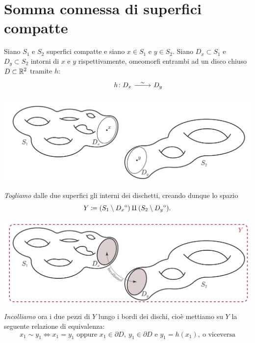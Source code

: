 \section{Somma connessa di superfici compatte}
Siano $S_1$ e $S_2$ superfici compatte e siano $x\in S_1$ e $y\in S_2$. Siano $D_x\subset S_1$ e $D_y\subset S_2$ intorni di $x$ e $y$ rispettivamente, omeomorfi entrambi ad un disco chiuso $D\subset\mathbb{R}^2$ tramite $h$:
\[\begin{tikzcd}
	{} & {h\colon D_x} & {D_y}
	\arrow["\sim", from=1-2, to=1-3]
\end{tikzcd}\]
\begin{center}
	\includegraphics[trim=0cm 0cm 0cm 0cm, clip, scale=0.4]{images/connectedsum1.pdf}
\end{center}
\textit{Togliamo} dalle due superfici gli interni dei dischetti, creando dunque lo spazio
\begin{equation*}
	Y\coloneqq (S_1\setminus {\kern0ptD_x}^{\mathrm{o}})\amalg (S_2\setminus {\kern0ptD_y}^{\mathrm{o}}).
\end{equation*}
\begin{center}
	\includegraphics[trim=0cm 0cm 0cm 0cm, clip, scale=0.4]{images/connectedsum2.pdf}
\end{center}
\textit{Incolliamo} ora i due pezzi di $Y$ lungo i bordi dei dischi, cioè mettiamo su $Y$ la seguente relazione di equivalenza:
\begin{equation*}
	x_1\sim y_1 \iff x_1=y_1\text{ oppure } x_1\in\partial{D},\ y_1\in\partial{D}\text{ e } y_1=h(x_1),\ \text{o viceversa}
\end{equation*}
